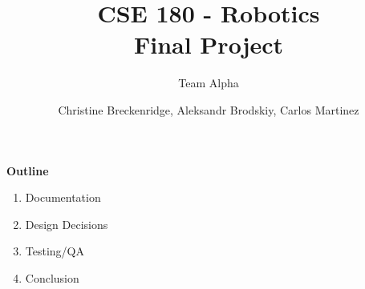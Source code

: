 \documentclass[12pt]{article}
\title{CSE 180 - Robotics \\ Final Project}
\subtitle{Team Alpha}
\author{Christine Breckenridge, Aleksandr Brodskiy, Carlos Martinez}
\begin{document}
\maketitle
{\setlength{\parindent}{0cm}
\textbf{Outline}
\begin{enumerate}  
\item Documentation
\item Design Decisions
\item Testing/QA
\item Conclusion\\\\\\\\\\\\\\\\\\\\\\\\\\\\\\\\\\
\end{enumerate} 
}
\end{document}
